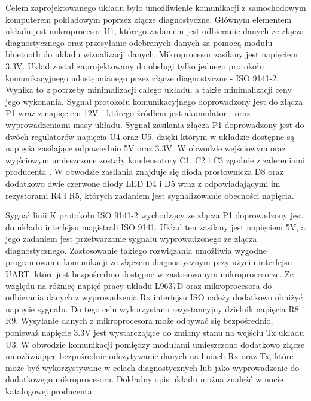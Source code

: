 \documentclass[12pt, twoside]{article} %
\numberwithin{equation}{subsection}
\numberwithin{figure}{section}
\numberwithin{table}{section}
\begin{document}
		\hspace{0.5cm}Celem zaprojektowanego układu było umożliwienie komunikacji z samochodowym komputerem pokładowym poprzez złącze diagnostyczne. Głównym elementem układu jest mikroprocesor U1, którego zadaniem jest odbieranie danych ze złącza diagnostycznego oraz przesyłanie odebranych danych za pomocą modułu bluetooth do układu wizualizacji danych. Mikroprocesor zasilany jest napięciem 3.3V. Układ został zaprojektowany do obsługi tylko jednego protokołu komunikacyjnego udostępnianego przez złącze diagnostyczne - ISO 9141-2. Wynika to z potrzeby minimalizacji całego układu, a także minimalizacji ceny jego wykonania. Sygnał protokołu komunikacyjnego doprowadzony jest do złącza P1 wraz z napięciem 12V - którego źródłem jest akumulator - oraz wyprowadzeniami masy układu. Sygnał zasilania złącza P1 doprowadzony jest do dwóch regulatorów napięcia U4 oraz U5, dzięki którym w układzie dostępne są napięcia zasilające odpowiednio 5V oraz 3.3V. W obwodzie wejściowym oraz wyjściowym umieszczone zostały kondensatory C1, C2 i C3 zgodnie z zaleceniami producenta \cite{MC7805}\cite{MCP17}. W obwodzie zasilania znajduje się dioda prostownicza D8 oraz dodatkowo dwie czerwone diody LED D4 i D5 wraz z odpowiadającymi im rezystorami R4 i R5, których zadaniem jest sygnalizowanie obecności napięcia.
		
		Sygnał linii K protokołu ISO 9141-2 wychodzący ze złącza P1 doprowadzony jest do układu interfejsu magistrali ISO 9141. Układ ten zasilany jest napięciem 5V, a jego zadaniem jest przetwarzanie sygnału wyprowadzonego ze złącza diagnostycznego. Zastosowanie takiego rozwiązania umożliwia wygodne programowanie komunikacji ze złączem diagnostycznym przy użyciu interfejsu UART, które  jest bezpośrednio dostępne w zastosowanym mikroprocesorze. Ze względu na różnicę napięć pracy układu L9637D oraz mikroprocesora do odbierania danych z wyprowadzenia Rx interfejsu ISO należy dodatkowo obniżyć napięcie sygnału. Do tego celu wykorzystano rezystancyjny dzielnik napięcia R8 i R9. Wysyłanie danych z mikroprocesora może odbywać się bezpośrednio, ponieważ napięcie 3.3V jest wystarczające do zmiany stanu na wejściu Tx układu U3. W obwodzie komunikacji pomiędzy modułami umieszczono dodatkowo złącze umożliwiające bezpośrednie odczytywanie danych na liniach Rx oraz Tx, które może być wykorzystywane w celach diagnostycznych lub jako wyprowadzenie do dodatkowego mikroprocesora. Dokładny opis układu można znaleźć w nocie katalogowej producenta \cite{L9637D}.
		
\end{document}

